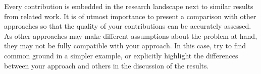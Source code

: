 


\noindent
Every contribution is embedded in the research landscape next to similar results from related work.
It is of utmost importance to present a comparison with other approaches so that the quality of your contributions can be accurately assessed.
As other approaches may make different assumptions about the problem at hand, they may not be fully compatible with your approach.
In this case, try to find common ground in a simpler example, or explicitly highlight the differences between your approach and others in the discussion of the results.

